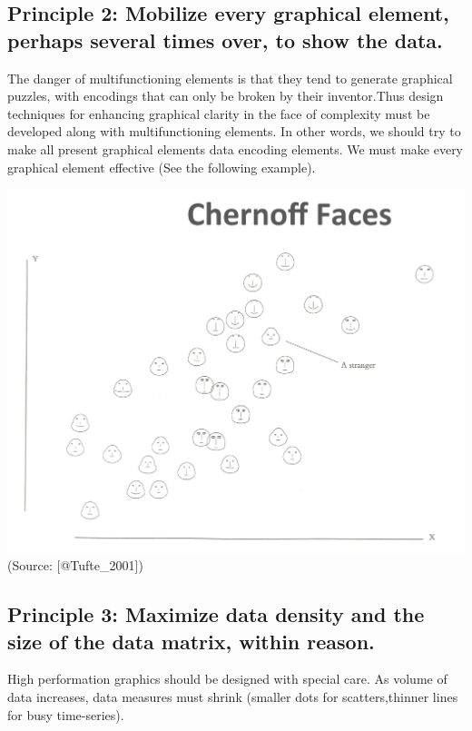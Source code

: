\documentclass[]{book}
\theoremstyle{definition}
\theoremstyle{definition}
\theoremstyle{definition}
\theoremstyle{remark}
\begin{document}
\subsection{Principle 2: Mobilize every graphical element, perhaps
several times over, to show the
data.}\label{principle-2-mobilize-every-graphical-element-perhaps-several-times-over-to-show-the-data.}

The danger of multifunctioning elements is that they tend to generate
graphical puzzles, with encodings that can only be broken by their
inventor.Thus design techniques for enhancing graphical clarity in the
face of complexity must be developed along with multifunctioning
elements. In other words, we should try to make all present graphical
elements data encoding elements. We must make every graphical element
effective (See the following example).

\includegraphics{images/Tufte_figure6.png} (Source: {[}@Tufte\_2001{]})

\subsection{Principle 3: Maximize data density and the size of the data
matrix, within
reason.}\label{principle-3-maximize-data-density-and-the-size-of-the-data-matrix-within-reason.}

High performation graphics should be designed with special care. As
volume of data increases, data measures must shrink (smaller dots for
scatters,thinner lines for busy time-series).
\end{document}

